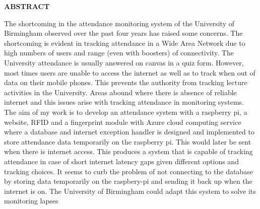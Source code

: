 \providecommand\phantomsection{} \phantomsection
\begin{center}
\providecommand\pdfbookmark[3][]{} \pdfbookmark[0]{Abstract}{bm:Abstract}
\vspace*{1in}
\textbf{ABSTRACT}\\[2\baselineskip]
\end{center}

The shortcoming in the attendance monitoring system of the University of Birmingham observed over the past four years has raised some concerns. The shortcoming is evident in tracking attendance in a Wide Area Network due to high numbers of users and range (even with boosters) of connectivity. The University attendance is usually answered on canvas in a quiz form. However, most times users are unable to access the internet as well as to track when out of data on their mobile phones. This prevents the authority from tracking lecture activities in the University. Areas abound where there is absence of reliable internet and this issues arise with tracking attendance in monitoring systems.
The aim of my work is to develop an attendance system with a raspberry pi, a website, RFID and a fingerprint module with Azure cloud computing service where a database and internet exception handler is designed and implemented to store attendance data temporarily on the raspberry pi. This would later be sent when there is internet access. 
This produces a system that is capable of tracking attendance in case of short internet latency gaps given different options and tracking choices. It seems to curb the problem of not connecting to the database by storing data temporarily on the raspbery-pi  and sending it back up when the internet is on. The University of Birmingham could adapt this system to solve its monitoring lapses
\textbf{}



